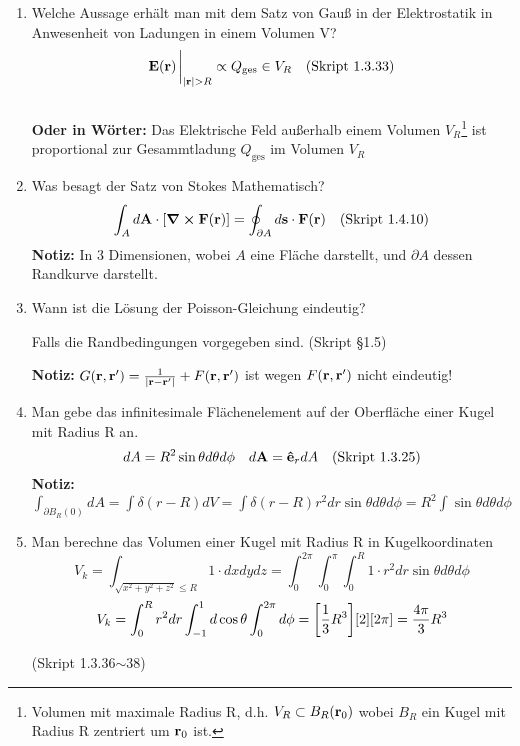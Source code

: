 \documentclass{scrartcl}
\newcommand{\rr}[1]{\frac{#1}{\abs{\vb{r}-\vb{r}'}}}
\newcommand{\ds}{\displaystyle}
\newcommand{\smref}[1]{\quad\text{(Skript #1)}}
\begin{document}
\begin{enumerate}
    \item Welche Aussage erhält man mit dem Satz von Gauß in der 
          Elektrostatik in Anwesenheit von Ladungen in einem Volumen V?
          $$\vb E(\vb r)\eval_{\abs{\vb r} > R}
            \propto Q_{\text{ges}}\in V_R
            \quad\text{(Skript 1.3.33)}$$\\
          \textbf{Oder in Wörter:} Das Elektrische Feld außerhalb 
          einem Volumen 
          $V_R$\footnote{Volumen mit 
            maximale Radius R, d.h. $V_R\subset B_R(\vb r_0)$ 
            wobei $B_R$ ein Kugel mit Radius R zentriert um $\vb r_0$ ist.}
          ist proportional zur Gesammtladung $Q_{\text{ges}}$ 
          im Volumen $V_R$

    \item Was besagt der Satz von Stokes Mathematisch?
          $$\ds \int_A d\vb A \cdot \qty[\curl \vb F(\vb r)]=
           \oint_{\partial A}d\vb s\cdot \vb F(\vb r)
           \quad\text{(Skript 1.4.10)}$$
          \textbf{Notiz:} In 3 Dimensionen, wobei $A$ eine Fläche 
          darstellt,
          und $\partial A$ dessen Randkurve darstellt.

    \item Wann ist die Lösung der Poisson-Gleichung eindeutig?
          \begin{center}
            Falls die Randbedingungen vorgegeben sind. (Skript §1.5)
          \end{center}
          \textbf{Notiz:} $G(\vb r, \vb r')=\rr{1} + F(\vb r, \vb r')$ 
          ist wegen $F(\vb r, \vb r')$ nicht eindeutig!
          
    \item Man gebe das infinitesimale Flächenelement auf der Oberfläche 
          einer Kugel mit Radius R an.
          $$\ds dA = R^2\sin\theta d\theta d\phi
          \quad d\vb A = \vu e_r dA \smref{1.3.25}$$
          \textbf{Notiz:} $\ds\int_{\partial B_R(0)} dA=\int\delta(r-R)dV
           =\int \delta(r-R)r^2dr\sin\theta d\theta d\phi
           =R^2 \int \sin\theta d\theta d\phi$

    \item Man berechne das Volumen einer Kugel mit Radius R 
          in Kugelkoordinaten\\
          $$\ds V_k=\int_{\sqrt{x^2+y^2+z^2}\le R} 1\cdot dxdydz
           =\int_0^{2\pi}\int_0^\pi\int_0^R 1\cdot r^2dr 
            \sin\theta d\theta d\phi$$
          $$\ds V_k=\int_0^R r^2 dr \int_{-1}^{1} d\cos\theta 
                   \int_0^{2\pi}d\phi
           =\qty[\frac{1}{3}R^3]\qty[2]\qty[2\pi]=\frac{4\pi}{3}R^3$$
          \begin{center}
            (Skript 1.3.36$\sim$38)
          \end{center}


\end{enumerate}
\end{document}
